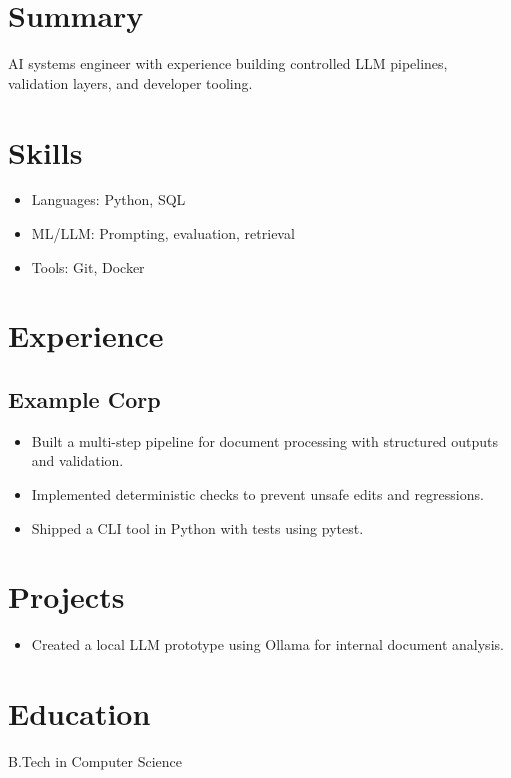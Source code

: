 \documentclass[11pt]{article}
\begin{document}
\section{Summary}
AI systems engineer with experience building controlled LLM pipelines, validation layers, and developer tooling.

\section{Skills}
\begin{itemize}
  \item Languages: Python, SQL
  \item ML/LLM: Prompting, evaluation, retrieval
  \item Tools: Git, Docker
\end{itemize}

\section{Experience}
\subsection{Example Corp}
\begin{itemize}
  \item Built a multi-step pipeline for document processing with structured outputs and validation.
  \item Implemented deterministic checks to prevent unsafe edits and regressions.
  \item Shipped a CLI tool in Python with tests using pytest.
\end{itemize}

\section{Projects}
\begin{itemize}
  \item Created a local LLM prototype using Ollama for internal document analysis.
\end{itemize}

\section{Education}
B.Tech in Computer Science
\end{document}

